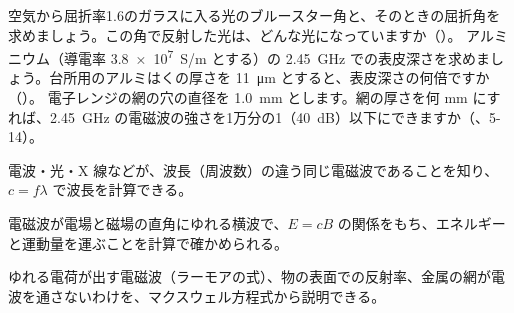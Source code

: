 \bkproblem 空気から屈折率1.6のガラスに入る光のブルースター角と、そのときの屈折角を求めましょう。この角で反射した光は、どんな光になっていますか（\nobreak{}\nobreak）。
\bkproblem アルミニウム（導電率 \qty{3.8e7}{S/m} とする）の \qty{2.45}{GHz} での表皮深さを求めましょう。台所用のアルミはくの厚さを \qty{11}{\micro m} とすると、表皮深さの何倍ですか（\nobreak{}\nobreak）。
\bkproblem 電子レンジの網の穴の直径を \qty{1.0}{mm} とします。網の厚さを何 mm にすれば、\qty{2.45}{GHz} の電磁波の強さを1万分の1（\qty{40}{dB}）以下にできますか（\nobreak{}\nobreak、5-14）。

\begin{furikaeri}
\begin{checklist}
\item 電波・光・X 線などが、波長（周波数）の違う同じ電磁波であることを知り、$c=f\lambda$ で波長を計算できる。
\item 電磁波が電場と磁場の直角にゆれる横波で、$E=cB$ の関係をもち、エネルギーと運動量を運ぶことを計算で確かめられる。
\item ゆれる電荷が出す電磁波（ラーモアの式）、物の表面での反射率、金属の網が電波を通さないわけを、マクスウェル方程式から説明できる。
\end{checklist}
\end{furikaeri}
